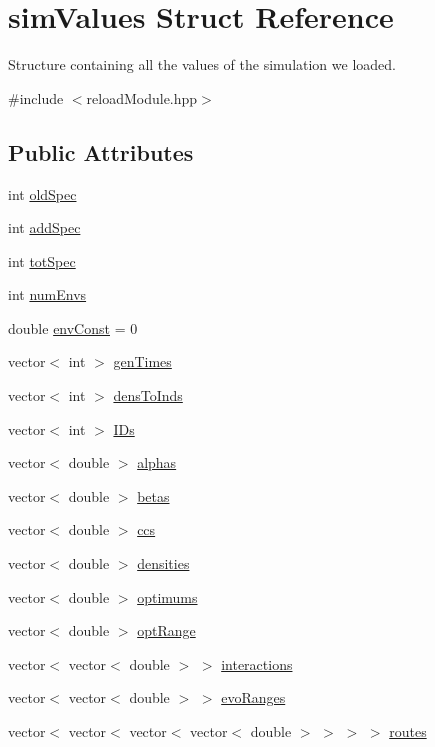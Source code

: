 \hypertarget{structsimValues}{}\section{sim\+Values Struct Reference}
\label{structsimValues}


Structure containing all the values of the simulation we loaded.  




{\ttfamily \#include $<$reload\+Module.\+hpp$>$}

\subsection*{Public Attributes}
\begin{DoxyCompactItemize}
\item 
int \hyperlink{structsimValues_a409841bd1a747a200c99c86bfd11a78a}{old\+Spec}
\item 
int \hyperlink{structsimValues_ac7fbf812eba3e2b88996d1366131bf8e}{add\+Spec}
\item 
int \hyperlink{structsimValues_aeb4d9fe040a0ecb69669675753088a10}{tot\+Spec}
\item 
int \hyperlink{structsimValues_ae28b0e24d2b560548b1f4ba0eea035ee}{num\+Envs}
\item 
double \hyperlink{structsimValues_a0b3bdcfb8a911b35e71ab03aad776453}{env\+Const} = 0
\item 
vector$<$ int $>$ \hyperlink{structsimValues_a0c396a3dc37a1ecf668cbf0d6f52305f}{gen\+Times}
\item 
vector$<$ int $>$ \hyperlink{structsimValues_a658893629c5a789c447057da417e5096}{dens\+To\+Inds}
\item 
vector$<$ int $>$ \hyperlink{structsimValues_afe2312ca2bca46eac7a108d1aa9c88f0}{I\+Ds}
\item 
vector$<$ double $>$ \hyperlink{structsimValues_aa7977c641471b71ca3f88d98e2b01831}{alphas}
\item 
vector$<$ double $>$ \hyperlink{structsimValues_ab7b209f99b228a55680d64fc964b0d34}{betas}
\item 
vector$<$ double $>$ \hyperlink{structsimValues_a08f1c4e0b6042043876d9d2d2699a922}{ccs}
\item 
vector$<$ double $>$ \hyperlink{structsimValues_a14ed3f6bacb44ceb58b7929e90fe0516}{densities}
\item 
vector$<$ double $>$ \hyperlink{structsimValues_ab00d0541616bb1d309639954b90b3e1d}{optimums}
\item 
vector$<$ double $>$ \hyperlink{structsimValues_a8b045e15d8493873f87bbfb99cc6c10d}{opt\+Range}
\item 
vector$<$ vector$<$ double $>$ $>$ \hyperlink{structsimValues_afacf91cde42df4983ac4640c6fe78470}{interactions}
\item 
vector$<$ vector$<$ double $>$ $>$ \hyperlink{structsimValues_a5c4fa1fbabac24649729c3692bd2a59f}{evo\+Ranges}
\item 
vector$<$ vector$<$ vector$<$ vector$<$ double $>$ $>$ $>$ $>$ \hyperlink{structsimValues_a6745659920f5fb456202f8c84cb75a46}{routes}
\end{DoxyCompactItemize}


